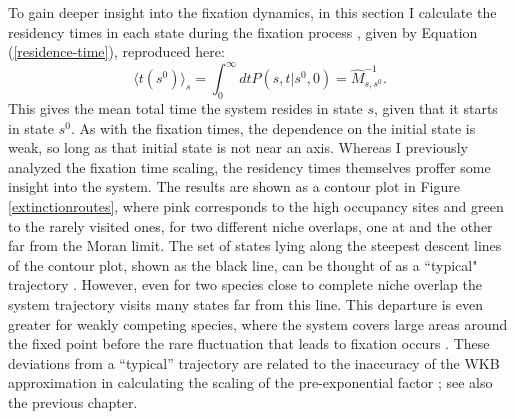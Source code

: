 To gain deeper insight into the fixation dynamics, in this section I calculate the residency times in each state during the fixation process \cite{Grinstead2003}, given by Equation (\ref{residence-time}), reproduced here:
\begin{equation*}
\langle t(s^0)\rangle_s = \int_0^{\infty} dt P(s,t|s^0,0)=\hat{M}^{-1}_{s,s^0}.
\end{equation*}
This gives the mean total time the system resides in state $s$, given that it starts in state $s^0$. 
As with the fixation times, the dependence on the initial state is weak, so long as that initial state is not near an axis. 
Whereas I previously analyzed the fixation time scaling, the residency times themselves proffer some insight into the system. 
The results are shown as a contour plot in Figure \ref{extinctionroutes}, where  pink  corresponds to the high occupancy sites and green to the rarely visited ones, for two different niche overlaps, one at and the other far from the Moran limit. 
The set of states lying along the steepest descent lines of the contour plot, shown as the black line, can be thought of as a ``typical" trajectory \cite{Gabel2013,Matkowsky1984,Kessler2007}. 
However, even for two species close to complete niche overlap the system trajectory visits many states far from this line. 
This departure is even greater for weakly competing species, where the system covers large areas around the fixed point before the rare fluctuation that leads to fixation occurs \cite{Gottesman2012}. 
These deviations from a ``typical'' trajectory are related to the inaccuracy of the WKB approximation in calculating the scaling of the pre-exponential factor \cite{Assaf2016,Gottesman2012,Lande1993}; see also the previous chapter. %

